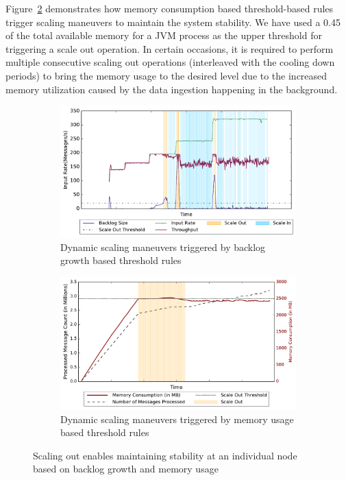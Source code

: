 Figure~\ref{fig:stability-mem} demonstrates how memory consumption based threshold-based rules trigger scaling maneuvers to maintain the system stability.
We have used a 0.45 of the total available memory for a JVM process as the upper threshold for triggering a scale out operation.
In certain occasions, it is required to perform multiple consecutive scaling out operations (interleaved with the cooling down periods) to bring the memory usage to the desired level due to the increased memory utilization caused by the data ingestion happening in the background.
\begin{figure}[h!]
    \begin{subfigure}{0.48\textwidth}
            \centering
            \includegraphics[scale=0.42]{figures/stability_partial.pdf}
            \caption{Dynamic scaling maneuvers triggered by backlog growth based threshold rules}
            \label{fig:stability-backlog}
    \end{subfigure}
    \begin{subfigure}{0.48\textwidth}
            \centering
            \includegraphics[scale=0.42]{figures//mem_stability.pdf} 
            \caption{Dynamic scaling maneuvers triggered by memory usage based threshold rules}
            \label{fig:stability-mem}
    \end{subfigure}
    \caption{Scaling out enables maintaining stability at an individual node based on backlog growth and memory usage}
    \label{fig:system-stability}
\end{figure}

